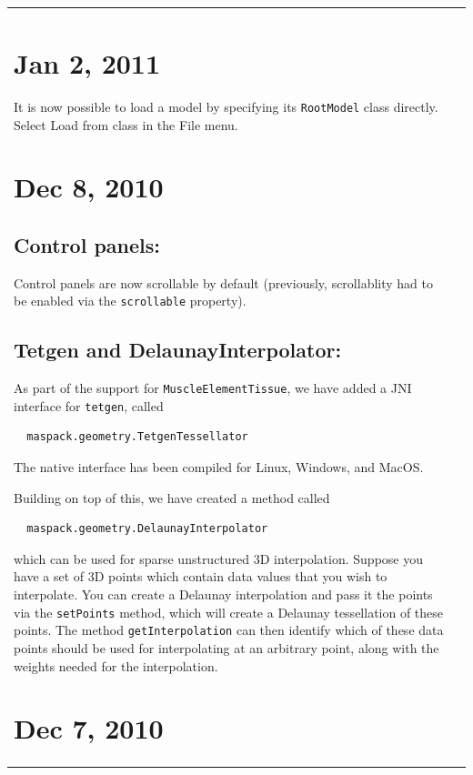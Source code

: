 \documentclass{article}
\begin{document}
\begin{tabular}{ll}
\section*{Jan 2, 2011}

It is now possible to load a model by specifying its {\tt RootModel} class
directly. Select {\sf Load from class} in the {\sf File} menu.

\section*{Dec 8, 2010}

\subsection*{Control panels:}

Control panels are now scrollable by default (previously, scrollablity
had to be enabled via the {\tt scrollable} property).

\subsection*{Tetgen and DelaunayInterpolator:}

As part of the support for {\tt MuscleElementTissue}, we have added a JNI
interface for {\tt tetgen}, called 

\begin{verbatim}
  maspack.geometry.TetgenTessellator
\end{verbatim}

The native interface has been compiled for Linux, Windows, and MacOS.

Building on top of this, we have created a method called

\begin{verbatim}
  maspack.geometry.DelaunayInterpolator
\end{verbatim}

which can be used for sparse unstructured 3D interpolation. Suppose
you have a set of 3D points which contain data values that you wish to
interpolate. You can create a Delaunay interpolation and pass it the
points via the {\tt setPoints} method, which will create a Delaunay
tessellation of these points.  The method {\tt getInterpolation} can then
identify which of these data points should be used for interpolating
at an arbitrary point, along with the weights needed for the
interpolation.

\section*{Dec 7, 2010}


\end{tabular}
\end{document}
